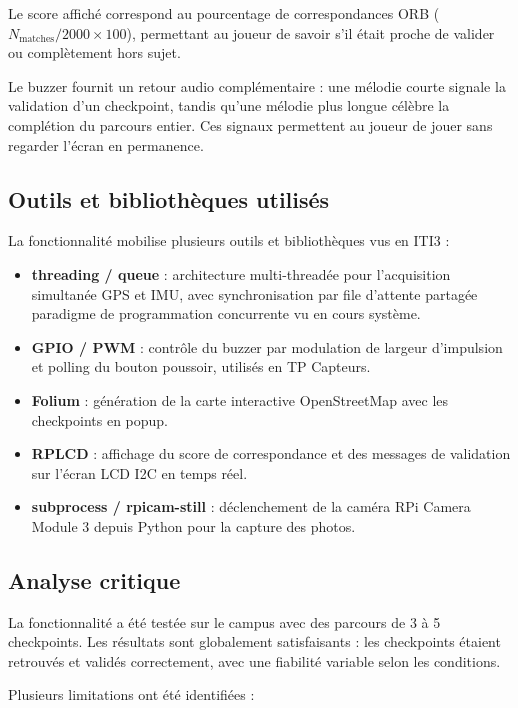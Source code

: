 Le score affiché correspond au pourcentage de correspondances ORB
($N_{\text{matches}} / 2000 \times 100$), permettant au joueur de savoir
s'il était proche de valider ou complètement hors sujet.

Le buzzer fournit un retour audio complémentaire : une mélodie courte signale la validation d'un checkpoint, tandis qu'une mélodie
plus longue célèbre la complétion du parcours entier. Ces signaux permettent
au joueur de jouer sans regarder l'écran en permanence.



\subsection{Outils et bibliothèques utilisés}

La fonctionnalité mobilise plusieurs outils et bibliothèques vus en ITI3 :

\begin{itemize}
    \item \textbf{threading / queue} : architecture multi-threadée pour
    l'acquisition simultanée GPS et IMU, avec synchronisation par file
    d'attente partagée paradigme de programmation concurrente vu en
    cours système.
    \item \textbf{GPIO / PWM} : contrôle du buzzer par modulation de
    largeur d'impulsion et polling du bouton poussoir, utilisés en TP
    Capteurs.
    \item \textbf{Folium} : génération de la carte interactive OpenStreetMap
    avec les checkpoints en popup.
    \item \textbf{RPLCD} : affichage du score de correspondance et des
    messages de validation sur l'écran LCD I2C en temps réel.
    \item \textbf{subprocess / rpicam-still} : déclenchement de la caméra
    RPi Camera Module 3 depuis Python pour la capture des photos.
\end{itemize}

\subsection{Analyse critique}

La fonctionnalité a été testée sur le campus avec des parcours de 3 à 5
checkpoints. Les résultats sont globalement satisfaisants : les checkpoints
étaient retrouvés et validés correctement, avec une fiabilité variable selon
les conditions.

Plusieurs limitations ont été identifiées :

